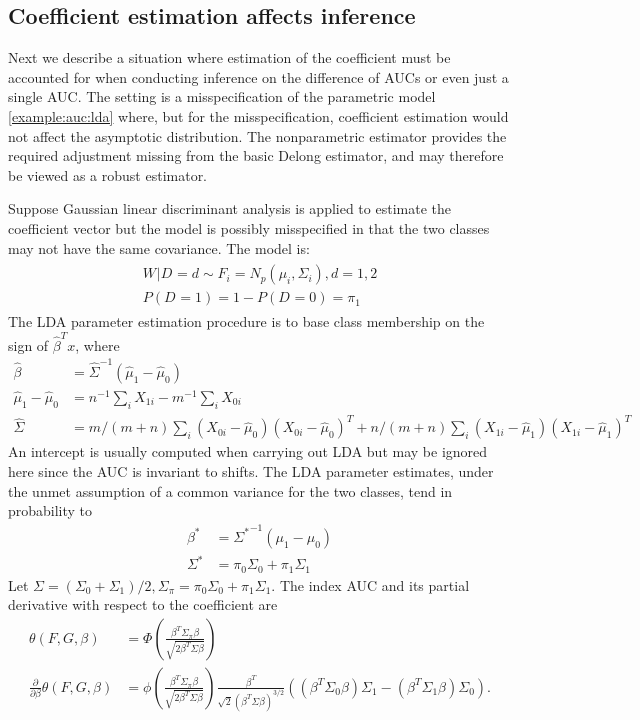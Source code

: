 \documentclass[12pt]{article}
\renewcommand{\P}{P}
\newcommand{\X}[1][]{X_{0#1}}
\newcommand{\Y}[1][]{X_{1#1}}
\newcommand{\W}[1][]{W_{#1}}
\newcommand{\D}[1][]{D_{#1}}
\renewcommand{\t}[1]{{#1}^T}
\renewcommand{\star}[1]{{#1}^\ast}
\newcommand{\F}{F}
\newcommand{\G}{G}
\newcommand{\m}{m}
\newcommand{\n}{n}
\newcommand{\N}{m+n}
\newcommand{\auc}{\theta}
\theoremstyle{definition}
\begin{document}
\subsection{Coefficient estimation affects inference}\label{section:lda}
Next we describe a situation where estimation of the coefficient must be
accounted for when conducting inference on the difference of AUCs or
even just a single AUC. The setting is a misspecification of the
parametric model \ref{example:auc:lda} where, but for the
misspecification, coefficient estimation would not affect the
asymptotic distribution. The nonparametric estimator provides the
required adjustment missing from the basic Delong estimator, and may
therefore be viewed as a robust estimator.

Suppose Gaussian linear discriminant analysis is applied to estimate
the coefficient vector but the model is possibly misspecified in that
the two classes may not have the same covariance. The model is:
\begin{gather}
  \begin{aligned}\label{model:heteroskedastic lda}
    \W | \D=d \sim \F_i=N_p(\mu_i,\Sigma_i), d=1,2\\
    \P(\D=1)=1-P(\D=0)=\pi_1
  \end{aligned}
\end{gather}
The LDA parameter estimation procedure is to base class membership on
the sign of $\t{\hat\beta} x$, where
  \begin{align}
    \hat\beta&=\hat{\Sigma}^{-1}(\hat\mu_1-\hat\mu_0)\\
    \hat\mu_1-\hat\mu_0&=\n^{-1}\sum_i\Y[i] - \m^{-1}\sum_i\X[i]\\
    \hat\Sigma &= \m/(\N)\sum_i(\X[i]-\hat\mu_0)\t{(\X[i]-\hat\mu_0)} + \n/(\N)\sum_i(\Y[i]-\hat\mu_1)\t{(\Y[i]-\hat\mu_1)}
  \end{align}
  An intercept is usually computed when carrying out LDA but may be
  ignored here since the AUC is invariant to shifts. The LDA parameter
  estimates, under the unmet assumption of a common variance for the
  two classes, tend in probability to
  \begin{align}
    \star\beta &={\star{\Sigma}}^{-1}(\mu_1-\mu_0)\\
    \star\Sigma &= \pi_0\Sigma_0+\pi_1\Sigma_1
  \end{align}
  Let
  $\Sigma=(\Sigma_0+\Sigma_1)/2,\Sigma_\pi=\pi_0\Sigma_0+\pi_1\Sigma_1$.
  The index AUC and its partial derivative with respect to the
  coefficient are
  \begin{align}
    \auc(\F,\G,\beta) &= \Phi\left(\frac{\t\beta\Sigma_\pi\beta}{\sqrt{2\t\beta\Sigma\beta}}\right)\\
    \frac{\partial}{\partial\beta}\auc(\F,\G,\beta) &= \phi\left(\frac{\t\beta\Sigma_\pi\beta}{\sqrt{2\t\beta\Sigma\beta}}\right)\frac{\t\beta}{\sqrt{2}(\t\beta\Sigma\beta)^{3/2}}
                                                      ((\t\beta\Sigma_0\beta)\Sigma_1-(\t\beta\Sigma_1\beta)\Sigma_0).
  \end{align}
\end{document}
